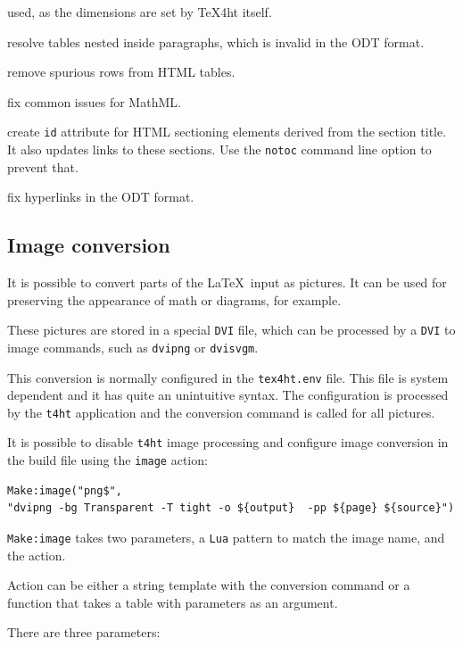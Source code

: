 \begin{description}
used, as the dimensions are set by TeX4ht itself.
\item[odtpartable]
resolve tables nested inside paragraphs, which is invalid in the ODT
format.
\item[tablerows]
remove spurious rows from HTML tables.
\item[mathmlfixes]
fix common issues for MathML.
\item[sectionid]
create \texttt{id} attribute for HTML sectioning elements derived from
the section title. It also updates links to these sections. Use the
\texttt{notoc} command line option to prevent that.
\item[t4htlinks]
fix hyperlinks in the ODT format.
\end{description}

\subsection{Image conversion}\label{image-conversion}

\label{sec:imageconversion}

It is possible to convert parts of the \LaTeX~input as pictures. It can
be used for preserving the appearance of math or diagrams, for example.

These pictures are stored in a special \texttt{DVI} file, which can be
processed by a \texttt{DVI} to image commands, such as \texttt{dvipng}
or \texttt{dvisvgm}.

This conversion is normally configured in the \texttt{tex4ht.env} file.
This file is system dependent and it has quite an unintuitive syntax.
The configuration is processed by the \texttt{t4ht} application and the
conversion command is called for all pictures.

It is possible to disable \texttt{t4ht} image processing and configure
image conversion in the build file using the \texttt{image} action:

\begin{verbatim}
Make:image("png$",
"dvipng -bg Transparent -T tight -o ${output}  -pp ${page} ${source}")
\end{verbatim}

\texttt{Make:image} takes two parameters, a \texttt{Lua} pattern to
match the image name, and the action.

Action can be either a string template with the conversion command or a
function that takes a table with parameters as an argument.

There are three parameters:

